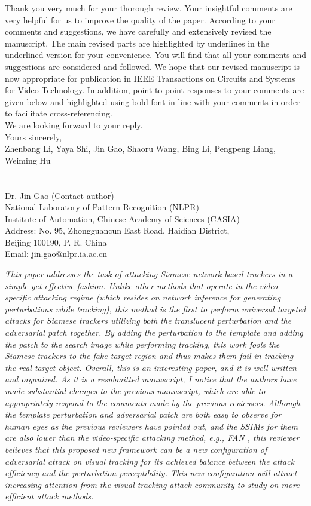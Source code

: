 \documentclass[12pt]{article}
\begin{document}
Thank you very much for your thorough review. Your insightful comments are very helpful for us to improve the quality of the paper. According to your comments and suggestions, we have carefully and extensively revised the manuscript. The main revised parts are highlighted by underlines in the underlined version for your convenience. You will find that all your comments and suggestions are considered and followed. We hope that our revised manuscript is now appropriate for publication in IEEE Transactions on Circuits and Systems for Video Technology.
In addition, point-to-point responses to your comments are given below and highlighted using bold font in line with your comments in order to facilitate cross-referencing.\\[10pt]
\indent We are looking forward to your reply.\\[10pt]
\noindent Yours sincerely,\\
\noindent Zhenbang Li, Yaya Shi, Jin Gao, Shaoru Wang, Bing Li, Pengpeng Liang, Weiming Hu
\\
\\
\\
\noindent Dr. Jin Gao (Contact author)\\
\noindent National Laboratory of Pattern Recognition (NLPR)\\
\noindent Institute of Automation, Chinese Academy of Sciences (CASIA)\\
\noindent Address: No. 95, Zhongguancun East Road, Haidian District,\\
\noindent Beijing 100190, P. R. China\\
\noindent Email: jin.gao@nlpr.ia.ac.cn

\newpage
\textit{This paper addresses the task of attacking Siamese network-based trackers in a simple yet effective fashion. Unlike other methods that operate in the video-specific attacking regime (which resides on network inference for generating perturbations while tracking), this method is the first to perform universal targeted attacks for Siamese trackers utilizing both the translucent perturbation and the adversarial patch together. By adding the perturbation to the template and adding the patch to the search image while performing tracking, this work fools the Siamese trackers to the fake target region and thus makes them fail in tracking the real target object. Overall, this is an interesting paper, and it is well written and organized. As it is a resubmitted manuscript, I notice that the authors have made substantial changes to the previous manuscript, which are able to appropriately respond to the comments made by the previous reviewers. Although the template perturbation and adversarial patch are both easy to observe for human eyes as the previous reviewers have pointed out, and the SSIMs for them are also lower than the video-specific attacking method, e.g., FAN \cite{FAN}, this reviewer believes that this proposed new framework can be a new configuration of adversarial attack on visual tracking for its achieved balance between the attack efficiency and the perturbation perceptibility. This new configuration will attract increasing attention from the visual tracking attack community to study on more efficient attack methods.}
\end{document}

